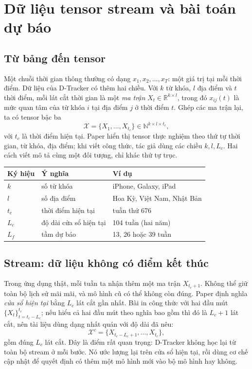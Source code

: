 \section{Dữ liệu tensor stream và bài toán dự báo}
\label{sec:problem}

\subsection{Từ bảng đến tensor}

Một chuỗi thời gian thông thường có dạng $x_1,x_2,\ldots,x_T$: một giá trị tại mỗi thời điểm.
Dữ liệu của D-Tracker có thêm hai chiều. Với $k$ từ khóa, $l$ địa điểm và $t$ thời điểm, mỗi
lát cắt thời gian là một \emph{ma trận} $X_t\in\mathbb{R}^{k\times l}$, trong đó
$x_{ij}(t)$ là mức quan tâm của từ khóa $i$ tại địa điểm $j$ ở thời điểm $t$. Ghép các ma trận
lại, ta có tensor bậc ba
\begin{equation}
  \mathcal{X}=\{X_1,\ldots,X_{t_c}\}\in\mathbb{N}^{k\times l\times t_c},
  \label{eq:stream}
\end{equation}
với $t_c$ là thời điểm hiện tại. Paper hiển thị tensor thực nghiệm theo thứ tự thời gian, từ khóa,
địa điểm; khi viết công thức, tác giả dùng các chiều $k,l,L_c$. Hai cách viết mô tả cùng một đối
tượng, chỉ khác thứ tự trục.

\begin{center}
\small
\begin{tabular}{@{}lll@{}}
  \toprule
  Ký hiệu & Ý nghĩa & Ví dụ \\
  \midrule
  $k$ & số từ khóa & iPhone, Galaxy, iPad \\
  $l$ & số địa điểm & Hoa Kỳ, Việt Nam, Nhật Bản \\
  $t_c$ & thời điểm hiện tại & tuần thứ 676 \\
  $L_c$ & độ dài cửa sổ hiện tại & 104 tuần (hai năm) \\
  $L_f$ & tầm dự báo & 13, 26 hoặc 39 tuần \\
  \bottomrule
\end{tabular}
\end{center}

\subsection{Stream: dữ liệu không có điểm kết thúc}

Trong ứng dụng thật, mỗi tuần ta nhận thêm một ma trận $X_{t_c+1}$. Không thể giữ toàn bộ lịch
sử mãi mãi, và mô hình cũ có thể không còn đúng. Paper định nghĩa \emph{cửa sổ hiện tại} bằng
$L_c$ lát cắt gần nhất. Bài in công thức với hai đầu mút
$\{X_t\}_{t=t_c-L_c}^{t_c}$; nếu hiểu cả hai đầu mút theo nghĩa bao gồm thì đó là $L_c+1$ lát cắt,
nên tài liệu dùng dạng nhất quán với độ dài đã nêu:
\begin{equation}
  \mathcal{X}^{c}=\{X_{t_c-L_c+1},\ldots,X_{t_c}\},
  \label{eq:window}
\end{equation}
gồm đúng $L_c$ lát cắt. Đây là điểm rất quan trọng: D-Tracker không học lại từ toàn bộ
stream ở mỗi bước. Nó ước lượng lại trên cửa sổ hiện tại, rồi dùng cơ chế cập nhật để quyết định
có thêm một mô hình mới vào bộ mô hình hay không.

